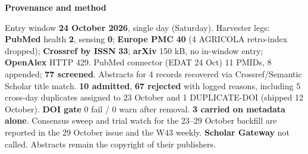 \documentclass[10pt]{article}
\begin{document}
\begin{keybox}
{\sffamily\bfseries\footnotesize\color{Deep}Provenance and method}\\[1.2mm]
{\fontsize{7.2}{8.8}\selectfont
Entry window \textbf{24 October 2026}, single day (Saturday). Harvester legs: \textbf{PubMed} health
\textbf{2}, sensing \textbf{0}; \textbf{Europe PMC} \textbf{40} (4 AGRICOLA retro-index dropped); \textbf{Crossref by
ISSN} \textbf{33}; \textbf{arXiv} 150 kB, no in-window entry; \textbf{OpenAlex} HTTP 429. PubMed connector (EDAT
24 Oct) 11 PMIDs, 8 appended; \textbf{77 screened}. Abstracts for 4 records recovered via Crossref/Semantic Scholar
title match. \textbf{10 admitted}, \textbf{67 rejected} with logged reasons, including 5 cross-day duplicates assigned
to 23 October and 1 DUPLICATE-DOI (shipped 12 October). \textbf{DOI gate} 0 fail / 0 warn after removal.
\textbf{3 carried on metadata alone}. Consensus sweep and trial watch for the 23--29 October backfill are reported in
the 29 October issue and the W43 weekly. \textbf{Scholar Gateway} not called. Abstracts remain the copyright of their
publishers.\par}
\end{keybox}
\end{document}
